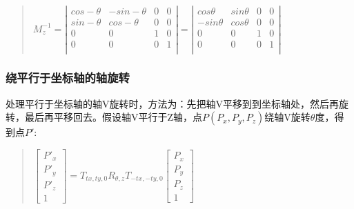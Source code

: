 \documentclass[a4paper,10pt]{article}
\begin{document}
\begin{CJK}{UTF8}{song}
\begin{enumerate}
\begin{quote}
\begin{math}
M_{z}^{-1}=\left|
\begin{array}{cccc}
cos-\theta & -sin-\theta & 0 & 0  \\
sin-\theta & cos-\theta & 0 & 0 \\
0 & 0 & 1 & 0 \\
0 & 0 & 0 & 1 \\
\end{array}
\right| 
=
\left| 
\begin{array}{cccc}
cos\theta & sin\theta & 0 & 0 \\
-sin\theta & cos\theta & 0 & 0 \\
0 & 0 & 1 & 0 \\
0 & 0 & 0 & 1 \\
\end{array}
\right|
\end{math}
\end{quote}
\end{enumerate}

\subsubsection{绕平行于坐标轴的轴旋转}
处理平行于坐标轴的轴V旋转时，方法为：先把轴V平移到到坐标轴处，然后再旋转，最后再平移回去。假设轴V平行于Z轴，点$P(P_{x},P_{y},P_{z})$绕轴V旋转$\theta$度，得到点$P'$:
\begin{quote}
$
\left[\begin{array}{c}
P'_{x} \\
P'_{y} \\
P'_{z} \\
1
\end{array}\right]=
T_{tx,ty,0}R_{\theta,z}T_{-tx,-ty,0}
\left[\begin{array}{c}
P_{x} \\
P_{y} \\
P_{z} \\
1
\end{array}\right]
$


\end{quote}
\end{CJK}
\end{document}
